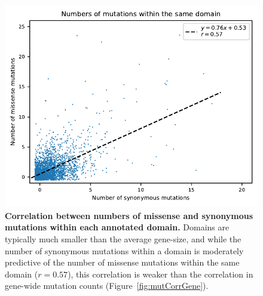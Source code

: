 \documentclass[]{article}
\begin{document}
\begin{figure}[ht!]
    \centering
    \includegraphics{../figures/mutations_in_domains}
    \caption{
        \textbf{Correlation between numbers of missense and synonymous mutations
        within each annotated domain.}
        Domains are typically much smaller than the average gene-size, and while
        the number of synonymous mutations within a domain is moderately predictive
        of the number of missense mutations within the same domain (\(r=0.57\)),
        this correlation is weaker than the correlation in gene-wide mutation
        counts (Figure~\ref{fig:mutCorrGene}).
    }
    \label{fig:mutCorrDomain}
\end{figure}
\end{document}
